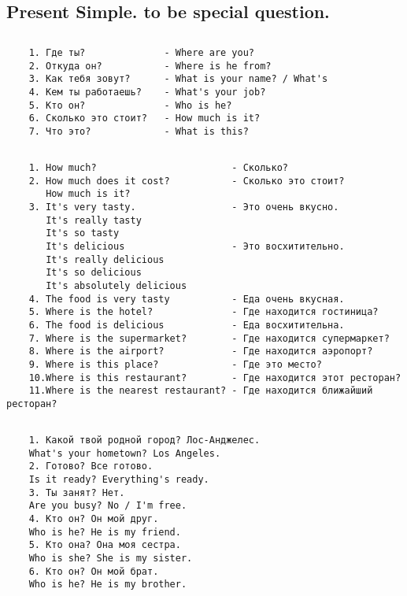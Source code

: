 \subsection{Present Simple. to be special question.}
\subsection*{}
\begin{verbatim}
    1. Где ты?              - Where are you?
    2. Откуда он?           - Where is he from?
    3. Как тебя зовут?      - What is your name? / What's
    4. Кем ты работаешь?    - What's your job?
    5. Кто он?              - Who is he?
    6. Сколько это стоит?   - How much is it?
    7. Что это?             - What is this?
\end{verbatim}

\subsection*{}
\begin{verbatim}
    1. How much?                        - Сколько?
    2. How much does it cost?           - Сколько это стоит?
       How much is it?
    3. It's very tasty.                 - Это очень вкусно.
       It's really tasty
       It's so tasty
       It's delicious                   - Это восхитительно.
       It's really delicious
       It's so delicious
       It's absolutely delicious
    4. The food is very tasty           - Еда очень вкусная.
    5. Where is the hotel?              - Где находится гостиница?
    6. The food is delicious            - Еда восхитительна.
    7. Where is the supermarket?        - Где находится супермаркет?
    8. Where is the airport?            - Где находится аэропорт?
    9. Where is this place?             - Где это место?
    10.Where is this restaurant?        - Где находится этот ресторан?
    11.Where is the nearest restaurant? - Где находится ближайший ресторан?
\end{verbatim}

\subsection*{}
\begin{verbatim}
    1. Какой твой родной город? Лос-Анджелес.
    What's your hometown? Los Angeles.
    2. Готово? Все готово.
    Is it ready? Everything's ready.
    3. Ты занят? Нет.
    Are you busy? No / I'm free.
    4. Кто он? Он мой друг.
    Who is he? He is my friend.
    5. Кто она? Она моя сестра.
    Who is she? She is my sister.
    6. Кто он? Он мой брат.
    Who is he? He is my brother.
\end{verbatim}


